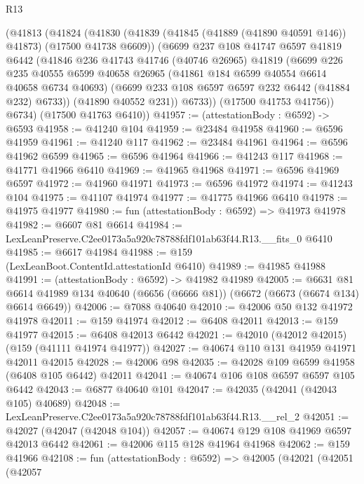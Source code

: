 \begin{lexlean}{R13}
\begin{coremodule}
      (@41813
        (@41824
          (@41830
            (@41839 (@41845 (@41889 (@41890 @40591 @146)) @41873) (@17500 @41738 @6609))
            (@6699
              @237
              @108
              @41747
              @6597
              @41819
              @6442
              (@41846
                @236
                @41743
                @41746
                (@40746 @26965)
                @41819
                (@6699
                  @226
                  @235
                  @40555
                  @6599
                  @40658
                  @26965
                  (@41861 @184 @6599 @40554 @6614 @40658 @6734 @40693)
                  (@6699 @233 @108 @6597 @6597 @232 @6442 (@41884 @232) @6733))
                (@41890 @40552 @231))
              @6733))
          (@17500 @41753 @41756))
        @6734)
      (@17500 @41763 @6410))
@41957 := (attestationBody : @6592) -> @6593
@41958 := @41240 @104
@41959 := @23484 @41958
@41960 := @6596 @41959
@41961 := @41240 @117
@41962 := @23484 @41961
@41964 := @6596 @41962 @6599
@41965 := @6596 @41964
@41966 := @41243 @117
@41968 := @41771 @41966 @6410
@41969 := @41965 @41968
@41971 := @6596 @41969 @6597
@41972 := @41960 @41971
@41973 := @6596 @41972
@41974 := @41243 @104
@41975 := @41107 @41974
@41977 := @41775 @41966 @6410
@41978 := @41975 @41977
@41980 := fun (attestationBody : @6592) => @41973 @41978
@41982 := @6607 @81 @6614
@41984 := LexLeanPreserve.C2ee0173a5a920c78788fdf101ab63f44.R13.__fits_0 @6410
@41985 := @6617 @41984
@41988 := @159 (LexLeanBoot.ContentId.attestationId @6410)
@41989 := @41985 @41988
@41991 := (attestationBody : @6592) -> @41982 @41989
@42005 := @6631
    @81
    @6614
    @41989
    @134
    @40640
    (@6656 (@6666 @81))
    (@6672 (@6673 (@6674 @134) @6614 @6649))
@42006 := @7088 @40640
@42010 := @42006 @50 @132 @41972 @41978
@42011 := @159 @41974
@42012 := @6408 @42011
@42013 := @159 @41977
@42015 := @6408 @42013 @6442
@42021 := @42010 (@42012 @42015) (@159 (@41111 @41974 @41977))
@42027 := @40674 @110 @131 @41959 @41971 @42011 @42015
@42028 := @42006 @98
@42035 := @42028 @109 @6599 @41958 (@6408 @105 @6442) @42011
@42041 := @40674 @106 @108 @6597 @6597 @105 @6442
@42043 := @6877 @40640 @101
@42047 := @42035 (@42041 (@42043 @105) @40689)
@42048 := LexLeanPreserve.C2ee0173a5a920c78788fdf101ab63f44.R13.__rel_2
@42051 := @42027 (@42047 (@42048 @104))
@42057 := @40674 @129 @108 @41969 @6597 @42013 @6442
@42061 := @42006 @115 @128 @41964 @41968
@42062 := @159 @41966
@42108 := fun (attestationBody : @6592) =>
  @42005
    (@42021
      (@42051
        (@42057

\end{coremodule}
\end{lexlean}
